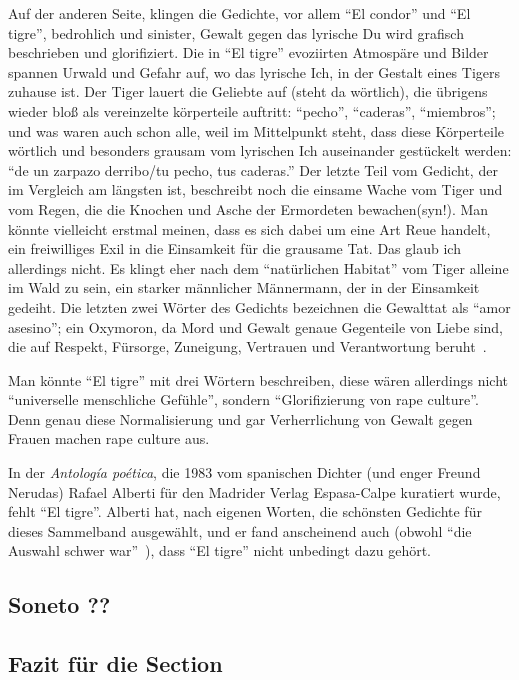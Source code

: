 Auf der anderen Seite, klingen die Gedichte, vor allem ``El condor'' und ``El tigre'', bedrohlich und sinister, Gewalt gegen das lyrische Du wird grafisch beschrieben und glorifiziert.
Die in ``El tigre'' evoziirten Atmospäre und Bilder spannen Urwald und Gefahr auf, wo das lyrische Ich, in der Gestalt eines Tigers zuhause ist.
Der Tiger lauert die Geliebte auf (steht da wörtlich), die übrigens wieder bloß als vereinzelte körperteile auftritt: ``pecho'', ``caderas'', ``miembros'';
und was waren auch schon alle, weil im Mittelpunkt steht, dass diese Körperteile wörtlich und besonders grausam vom lyrischen Ich auseinander gestückelt werden:
``de un zarpazo derribo/tu pecho, tus caderas.''
Der letzte Teil vom Gedicht, der im Vergleich am längsten ist, beschreibt noch die einsame Wache vom Tiger und vom Regen, die die Knochen und Asche der Ermordeten bewachen(syn!).
Man könnte vielleicht erstmal meinen, dass es sich dabei um eine Art Reue handelt, ein freiwilliges Exil in die Einsamkeit für die grausame Tat.
Das glaub ich allerdings nicht.
Es klingt eher nach dem ``natürlichen Habitat'' vom Tiger alleine im Wald zu sein, ein starker männlicher Männermann, der in der Einsamkeit gedeiht.
Die letzten zwei Wörter des Gedichts bezeichnen die Gewalttat als ``amor asesino'';
ein Oxymoron, da Mord und Gewalt genaue Gegenteile von Liebe sind, die auf Respekt, Fürsorge, Zuneigung, Vertrauen und Verantwortung beruht~\cite{hooks2001}.

Man könnte ``El tigre'' mit drei Wörtern beschreiben, diese wären allerdings nicht ``universelle menschliche Gefühle'', sondern ``Glorifizierung von rape culture''.
Denn genau diese Normalisierung und gar Verherrlichung von Gewalt gegen Frauen machen rape culture aus.

In der \textit{Antología poética}, die 1983 vom spanischen Dichter (und enger Freund Nerudas) Rafael Alberti für den Madrider Verlag Espasa-Calpe kuratiert wurde, fehlt ``El tigre''.
Alberti hat, nach eigenen Worten, die schönsten Gedichte für dieses Sammelband ausgewählt, und er fand anscheinend auch (obwohl ``die Auswahl schwer war''~\cite{Alberti1983}), dass ``El tigre'' nicht unbedingt dazu gehört.


\subsection{Soneto ??}

\subsection{Fazit für die Section}

